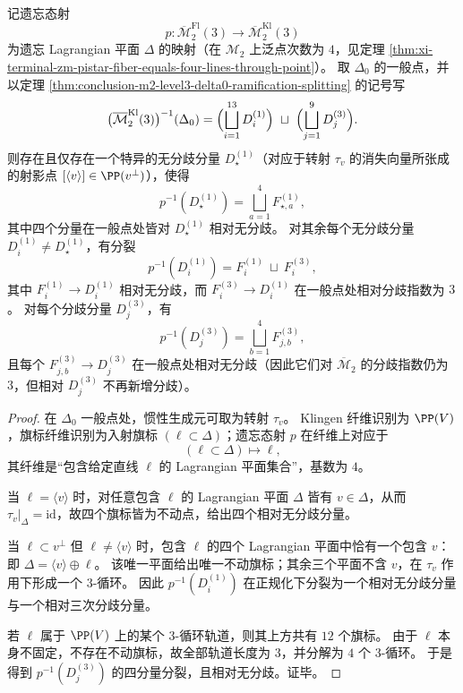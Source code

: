 \begin{theorem}\label{thm:conclusion-m2-level3-flag-over-klingen-delta0-refined-splitting}
记遗忘态射
\[
p:\overline{\mathcal M}_2^{\mathrm{Fl}}(3)\longrightarrow \overline{\mathcal M}_2^{\mathrm{Kl}}(3)
\]
为遗忘 Lagrangian 平面 \(\Delta\) 的映射（在 \(\mathcal M_2\) 上泛点次数为 \(4\)，见定理 \ref{thm:xi-terminal-zm-pistar-fiber-equals-four-lines-through-point}）。
取 \(\Delta_0\) 的一般点，并以定理 \ref{thm:conclusion-m2-level3-delta0-ramification-splitting} 的记号写
\[
\bigl(\overline{\mathcal M}_2^{\mathrm{Kl}}(3)\bigr)^{-1}(\Delta_0)
=\Bigl(\bigsqcup_{i=1}^{13}D_i^{(1)}\Bigr)\ \sqcup\ \Bigl(\bigsqcup_{j=1}^{9}D_j^{(3)}\Bigr).
\]
则存在且仅存在一个特异的无分歧分量 \(D_\star^{(1)}\)（对应于转射 \(\tau_v\) 的消失向量所张成的射影点 \([\langle v\rangle]\in \PP(v^\perp)\)），使得
\[
p^{-1}(D_\star^{(1)})=\bigsqcup_{a=1}^{4}F_{\star,a}^{(1)},
\]
其中四个分量在一般点处皆对 \(D_\star^{(1)}\) 相对无分歧。
对其余每个无分歧分量 \(D_i^{(1)}\neq D_\star^{(1)}\)，有分裂
\[
p^{-1}(D_i^{(1)})=F_{i}^{(1)}\ \sqcup\ F_{i}^{(3)},
\]
其中 \(F_i^{(1)}\to D_i^{(1)}\) 相对无分歧，而 \(F_i^{(3)}\to D_i^{(1)}\) 在一般点处相对分歧指数为 \(3\)。
对每个分歧分量 \(D_j^{(3)}\)，有
\[
p^{-1}(D_j^{(3)})=\bigsqcup_{b=1}^{4}F_{j,b}^{(3)},
\]
且每个 \(F_{j,b}^{(3)}\to D_j^{(3)}\) 在一般点处相对无分歧（因此它们对 \(\overline{\mathcal M}_2\) 的分歧指数仍为 \(3\)，但相对 \(D_j^{(3)}\) 不再新增分歧）。
\end{theorem}
\begin{proof}
在 \(\Delta_0\) 一般点处，惯性生成元可取为转射 \(\tau_v\)。
Klingen 纤维识别为 \(\PP(V)\)，旗标纤维识别为入射旗标 \((\ell\subset \Delta)\)；遗忘态射 \(p\) 在纤维上对应于
\[
(\ell\subset \Delta)\longmapsto \ell,
\]
其纤维是“包含给定直线 \(\ell\) 的 Lagrangian 平面集合”，基数为 \(4\)。
\par
当 \(\ell=\langle v\rangle\) 时，对任意包含 \(\ell\) 的 Lagrangian 平面 \(\Delta\) 皆有 \(v\in \Delta\)，从而 \(\tau_v|_\Delta=\mathrm{id}\)，故四个旗标皆为不动点，给出四个相对无分歧分量。
\par
当 \(\ell\subset v^\perp\) 但 \(\ell\neq \langle v\rangle\) 时，包含 \(\ell\) 的四个 Lagrangian 平面中恰有一个包含 \(v\)：即 \(\Delta=\langle v\rangle\oplus \ell\)。
该唯一平面给出唯一不动旗标；其余三个平面不含 \(v\)，在 \(\tau_v\) 作用下形成一个 \(3\)-循环。
因此 \(p^{-1}(D_i^{(1)})\) 在正规化下分裂为一个相对无分歧分量与一个相对三次分歧分量。
\par
若 \(\ell\) 属于 \(\PP(V)\) 上的某个 \(3\)-循环轨道，则其上方共有 \(12\) 个旗标。
由于 \(\ell\) 本身不固定，不存在不动旗标，故全部轨道长度为 \(3\)，并分解为 \(4\) 个 \(3\)-循环。
于是得到 \(p^{-1}(D_j^{(3)})\) 的四分量分裂，且相对无分歧。证毕。
\end{proof}

